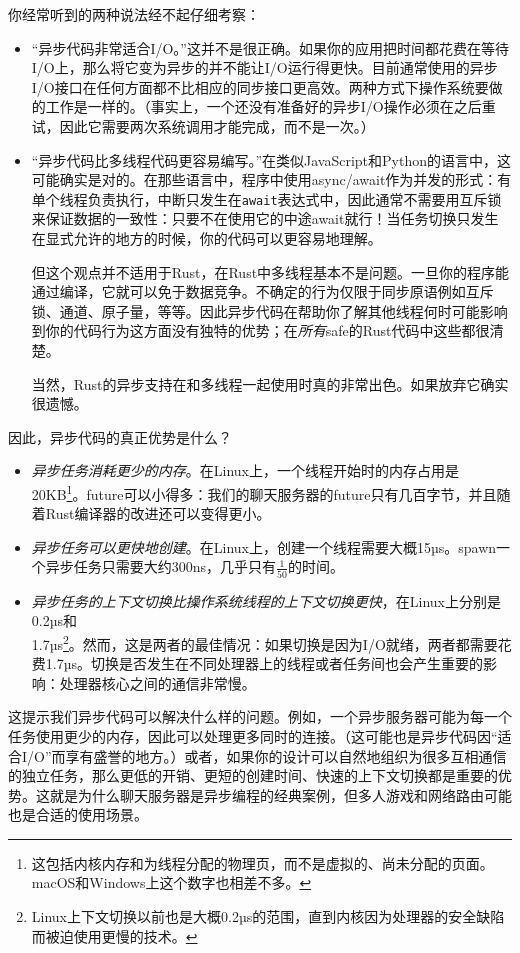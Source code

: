 你经常听到的两种说法经不起仔细考察：
\begin{itemize}
    \item “异步代码非常适合I/O。”这并不是很正确。如果你的应用把时间都花费在等待I/O上，那么将它变为异步的并不能让I/O运行得更快。目前通常使用的异步I/O接口在任何方面都不比相应的同步接口更高效。两种方式下操作系统要做的工作是一样的。（事实上，一个还没有准备好的异步I/O操作必须在之后重试，因此它需要两次系统调用才能完成，而不是一次。）
    \item “异步代码比多线程代码更容易编写。”在类似JavaScript和Python的语言中，这可能确实是对的。在那些语言中，程序中使用async/await作为并发的形式：有单个线程负责执行，中断只发生在\texttt{await}表达式中，因此通常不需要用互斥锁来保证数据的一致性：只要不在使用它的中途await就行！当任务切换只发生在显式允许的地方的时候，你的代码可以更容易地理解。
    
    但这个观点并不适用于Rust，在Rust中多线程基本不是问题。一旦你的程序能通过编译，它就可以免于数据竞争。不确定的行为仅限于同步原语例如互斥锁、通道、原子量，等等。因此异步代码在帮助你了解其他线程何时可能影响到你的代码行为这方面没有独特的优势；在\emph{所有}safe的Rust代码中这些都很清楚。

    当然，Rust的异步支持在和多线程一起使用时真的非常出色。如果放弃它确实很遗憾。
\end{itemize}

因此，异步代码的真正优势是什么？
\begin{itemize}
    \item \emph{异步任务消耗更少的内存}。在Linux上，一个线程开始时的内存占用是20KB\footnote{这包括内核内存和为线程分配的物理页，而不是虚拟的、尚未分配的页面。macOS和Windows上这个数字也相差不多。}。future可以小得多：我们的聊天服务器的future只有几百字节，并且随着Rust编译器的改进还可以变得更小。
    \item \emph{异步任务可以更快地创建}。在Linux上，创建一个线程需要大概15µs。spawn一个异步任务只需要大约300ns，几乎只有$\frac{1}{50}$的时间。
    \item \emph{异步任务的上下文切换比操作系统线程的上下文切换更快}，在Linux上分别是0.2µs和\\
    1.7µs\footnote{Linux上下文切换以前也是大概0.2µs的范围，直到内核因为处理器的安全缺陷而被迫使用更慢的技术。}。然而，这是两者的最佳情况：如果切换是因为I/O就绪，两者都需要花费1.7µs。切换是否发生在不同处理器上的线程或者任务间也会产生重要的影响：处理器核心之间的通信非常慢。
\end{itemize}

这提示我们异步代码可以解决什么样的问题。例如，一个异步服务器可能为每一个任务使用更少的内存，因此可以处理更多同时的连接。（这可能也是异步代码因“适合I/O”而享有盛誉的地方。）或者，如果你的设计可以自然地组织为很多互相通信的独立任务，那么更低的开销、更短的创建时间、快速的上下文切换都是重要的优势。这就是为什么聊天服务器是异步编程的经典案例，但多人游戏和网络路由可能也是合适的使用场景。


